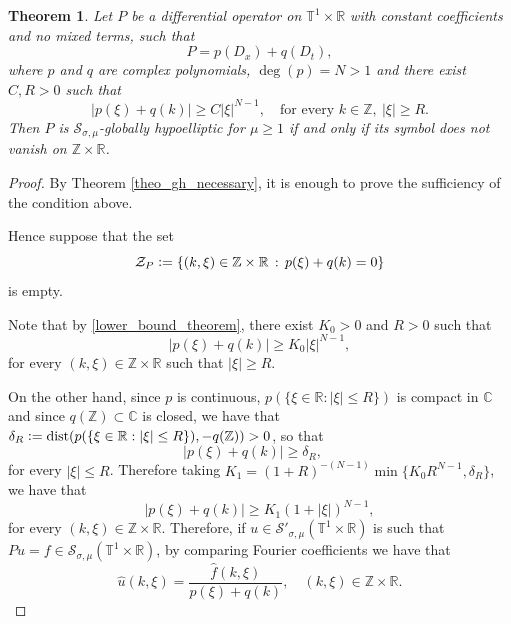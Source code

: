 \documentclass[11pt,reqno]{amsart}
\newtheorem{theorem}{Theorem}[section]
\numberwithin{equation}{section}
\theoremstyle{definition}
\theoremstyle{definition}
\newcommand{\T}{\mathbb{T}}
\newcommand{\G}{\mathnormal{\mathbb{T}^{m}\times\mathbb{R}^n}}
\newcommand{\R}{\mathbb{R}}
\newcommand{\Z}{\mathbb{Z}}
\newcommand{\s}{\mathcal{S}(\G)}
\renewcommand{\s}{\mathcal{S}_{\sigma,\mu}(\T^1\times\R)}
\renewcommand{\ss}{\mathcal{S}'_{\sigma,\mu}(\T^1\times\R)}
\newcommand{\defeq}{\vcentcolon=}
\begin{document}
\begin{theorem}\label{theo_gh_cte_N>1}
    Let $P$ be a differential operator on $\T^1\times\R$ with constant coefficients and no mixed terms, such that  $$P=p\left(D_x\right)+q\left(D_t\right),$$
   where $p$ and $q$ are complex polynomials,  $\deg(p)=N>1$ and there exist $C,R>0$ such that
       \begin{equation}\label{lower_bound_theorem}
           |p(\xi)+q(k)|\geq C|\xi|^{N-1},\quad \text{for every }k\in\Z,\ |\xi|\geq R.
       \end{equation}
       Then $P$ is $\mathcal{S}_{\sigma,\mu}$-globally hypoelliptic for $\mu\geq 1$ if and only if its symbol does not vanish on $\Z\times \R$.
\end{theorem}

\begin{proof}
  By Theorem \ref{theo_gh_necessary}, it is enough to prove the sufficiency of the condition above.
 
  Hence suppose that the set 
   \[\mathcal{Z}_P\defeq\{(k,\xi)\in\Z\times\R\,:\,p(\xi)+q(k)=0\}\]
   is empty.
   
Note that by \eqref{lower_bound_theorem}, there exist $K_0>0$ and $R>0$ such that
    \begin{equation*}
        |p(\xi)+q(k)|\geq K_0|\xi|^{N-1},
    \end{equation*}
    for every $(k,\xi)\in \Z\times \R$ such that $|\xi|\geq R$.

    On the other hand, since $p$ is continuous, $p(\{\xi\in\R:|\xi|\leq R\})$ is compact in $\mathbb{C}$ and since $q(\Z)\subset \mathbb{C}$ is closed, we have that $\delta_{ R}\defeq\operatorname{dist}(p(\{\xi\in\R:|\xi|\leq R\}),-q(\Z))>0$, so that
    \begin{equation}\label{delta_R}
        |p(\xi)+q(k)|\geq \delta_{R},\quad 
    \end{equation}
    for every  $|\xi|\leq  R$. Therefore taking $K_1=(1+R)^{-(N-1)}\min\{K_0 R^{N-1},{\delta_R}\}$, we have that 
    \begin{equation}\label{eq_symbol_decay_cte}
        |p(\xi)+q(k)|\geq K_1(1+|\xi|)^{N-1},
    \end{equation}
    for every $(k,\xi)\in \Z\times \R$. Therefore,  if $u\in\ss$ is such that $Pu=f\in\s$, by comparing Fourier coefficients we have that
    \[\widehat{u}(k,\xi)=\dfrac{\widehat{f}(k,\xi)}{p(\xi)+q(k)},\quad (k,\xi)\in\Z\times\R.\]
     

\end{proof}
\end{document}
